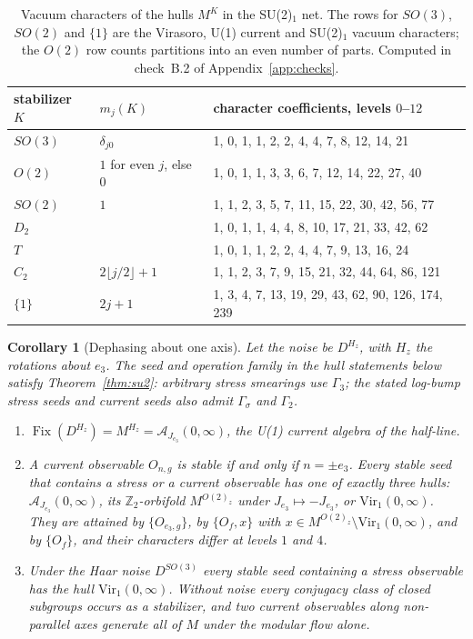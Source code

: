 \documentclass[12pt]{article}
\newtheorem{corollary}[theorem]{Corollary}
\theoremstyle{definition}
\theoremstyle{remark}
\newcommand{\Fix}{\operatorname{Fix}}
\newcommand{\Vir}{\mathrm{Vir}}
\begin{document}
\begin{table}[ht]
\centering
\small
\begin{tabular}{lll}
\toprule
stabilizer \(K\) & \(m_j(K)\) & character coefficients, levels \(0\)--\(12\)\\
\midrule
\(SO(3)\) & \(\delta_{j0}\) & 1, 0, 1, 1, 2, 2, 4, 4, 7, 8, 12, 14, 21\\
\(O(2)\) & \(1\) for even \(j\), else \(0\) & 1, 0, 1, 1, 3, 3, 6, 7, 12, 14, 22, 27, 40\\
\(SO(2)\) & \(1\) & 1, 1, 2, 3, 5, 7, 11, 15, 22, 30, 42, 56, 77\\
\(D_2\) & & 1, 0, 1, 1, 4, 4, 8, 10, 17, 21, 33, 42, 62\\
\(T\) & & 1, 0, 1, 1, 2, 2, 4, 4, 7, 9, 13, 16, 24\\
\(C_2\) & \(2\lfloor j/2\rfloor+1\) & 1, 1, 2, 3, 7, 9, 15, 21, 32, 44, 64, 86, 121\\
\(\{1\}\) & \(2j+1\) & 1, 3, 4, 7, 13, 19, 29, 43, 62, 90, 126, 174, 239\\
\bottomrule
\end{tabular}
\caption{Vacuum characters of the hulls \(M^K\) in the SU(2)\(_1\) net. The rows for
\(SO(3)\), \(SO(2)\) and \(\{1\}\) are the Virasoro, U(1) current and SU(2)\(_1\) vacuum
characters; the \(O(2)\) row counts partitions into an even number of parts. Computed
in check~B.2 of Appendix~\ref{app:checks}.}
\label{tab:chars}
\end{table}

\begin{corollary}[Dephasing about one axis]\label{cor:oneaxis}
Let the noise be \(D^{H_z}\), with \(H_z\) the rotations about \(e_3\).
The seed and operation family in the hull statements below satisfy
Theorem~\ref{thm:su2}: arbitrary stress smearings use \(\Gamma_3\);
the stated log-bump stress seeds and current seeds also admit
\(\Gamma_\sigma\) and \(\Gamma_2\).
\begin{enumerate}[label=(\alph*),leftmargin=2em]
\item \(\Fix(D^{H_z})=M^{H_z}=\mathcal A_{J_{e_3}}(0,\infty)\), the U(1) current algebra
  of the half-line.
\item A current observable \(O_{n,g}\) is stable if and only if \(n=\pm e_3\). Every
  stable seed that contains a stress or a current observable has one of exactly three
  hulls: \(\mathcal A_{J_{e_3}}(0,\infty)\), its \(\mathbb Z_2\)-orbifold
  \(M^{O(2)_z}\) under \(J_{e_3}\mapsto-J_{e_3}\), or \(\Vir_1(0,\infty)\). They are
  attained by \(\{O_{e_3,g}\}\), by \(\{O_f,x\}\) with
  \(x\in M^{O(2)_z}\setminus\Vir_1(0,\infty)\), and by \(\{O_f\}\), and their characters
  differ at levels \(1\) and \(4\).
\item Under the Haar noise \(D^{SO(3)}\) every stable seed containing a stress
  observable has the hull \(\Vir_1(0,\infty)\). Without noise every conjugacy class of
  closed subgroups occurs as a stabilizer, and two current observables along
  non-parallel axes generate all of \(M\) under the modular flow alone.
\end{enumerate}
\end{corollary}
\end{document}
